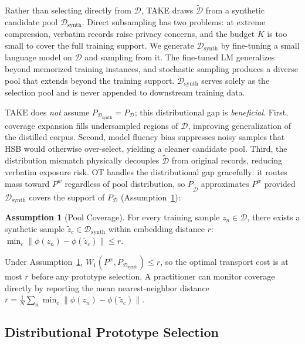 \documentclass[12pt, a4paper, twoside]{book}
\numberwithin{equation}{chapter}
\theoremstyle{plain}
\theoremstyle{definition}
\newtheorem{assumption}{Assumption}[chapter]
\theoremstyle{remark}
\newenvironment{foldable}{}{}
\begin{document}
\begin{foldable} Rather than selecting directly from $\mathcal{D}$, TAKE draws $\tilde{\mathcal{D}}$ from a synthetic candidate pool $\mathcal{D}_\text{synth}$.
  Direct subsampling has two problems: at extreme compression, verbatim records raise privacy concerns, and the budget $K$ is too small to cover the full training support.
  We generate $\mathcal{D}_\text{synth}$ by fine-tuning a small language model on $\mathcal{D}$ and sampling from it.
  The fine-tuned LM generalizes beyond memorized training instances, and stochastic sampling produces a diverse pool that extends beyond the training support.
  $\mathcal{D}_\text{synth}$ serves solely as the selection pool and is never appended to downstream training data.
\end{foldable}

\begin{foldable} TAKE does \textit{not} assume $P_{\mathcal{D}_\text{synth}} = P_{\mathcal{D}}$; this distributional gap is \textit{beneficial}.
  First, coverage expansion fills undersampled regions of $\mathcal{D}$, improving generalization of the distilled corpus.
  Second, model fluency bias suppresses noisy samples that \ac{HSB} would otherwise over-select, yielding a cleaner candidate pool.
  Third, the distribution mismatch physically decouples $\tilde{\mathcal{D}}$ from original records, reducing verbatim exposure risk.
  \Acl{OT} handles the distributional gap gracefully: it routes mass toward $P^w$ regardless of pool distribution, so $P_{\tilde{\mathcal{D}}}$ approximates $P^w$ provided $\mathcal{D}_\text{synth}$ covers the support of $P_{\mathcal{D}}$ (Assumption~\ref{ass:coverage}):
  \begin{assumption}[Pool Coverage] \label{ass:coverage}
    For every training sample $z_n \in \mathcal{D}$, there exists a synthetic sample $\tilde{z}_c \in \mathcal{D}_\text{synth}$ within embedding distance $r$:
    $\min_c \|\phi(z_n) - \phi(\tilde{z}_c)\| \leq r$.
  \end{assumption}
  Under Assumption~\ref{ass:coverage}, $W_1(P^w, P_{\mathcal{D}_\text{synth}}) \leq r$, so the optimal transport cost is at most $r$ before any prototype selection.
  A practitioner can monitor coverage directly by reporting the mean nearest-neighbor distance $\bar{r} = \frac{1}{N}\sum_n \min_c \|\phi(z_n) - \phi(\tilde{z}_c)\|$.
\end{foldable}

\subsection{Distributional Prototype Selection} \label{sec:53-research03-method-ot}
\end{document}

